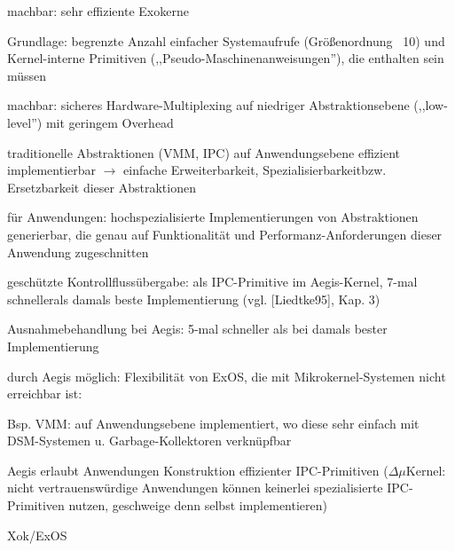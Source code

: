 \documentclass[a4paper]{article}
\begin{document}
\begin{multicols}{3}
    \begin{enumerate*}
        \item
        machbar: sehr effiziente Exokerne
        \begin{itemize*}
            \item Grundlage: begrenzte Anzahl einfacher Systemaufrufe (Größenordnung ~10) und Kernel-interne Primitiven (,,Pseudo-Maschinenanweisungen''), die enthalten sein müssen
        \end{itemize*}
        \item
        machbar: sicheres Hardware-Multiplexing auf niedriger
        Abstraktionsebene (,,low-level'') mit geringem Overhead
        \item
        traditionelle Abstraktionen (VMM, IPC) auf Anwendungsebene effizient
        implementierbar $\rightarrow$ einfache
        Erweiterbarkeit, Spezialisierbarkeitbzw. Ersetzbarkeit dieser
        Abstraktionen
        \item
        für Anwendungen: hochspezialisierte Implementierungen von
        Abstraktionen generierbar, die genau auf Funktionalität und
        Performanz-Anforderungen dieser Anwendung zugeschnitten
        \item
        geschützte Kontrollflussübergabe: als IPC-Primitive im Aegis-Kernel,
        7-mal schnellerals damals beste Implementierung (vgl. [Liedtke95],
        Kap. 3)
        \item
        Ausnahmebehandlung bei Aegis: 5-mal schneller als bei damals bester
        Implementierung
        \item
        durch Aegis möglich: Flexibilität von ExOS, die mit
        Mikrokernel-Systemen nicht erreichbar ist:
        \begin{itemize*}
            \item Bsp. VMM: auf Anwendungsebene implementiert, wo diese sehr einfach mit DSM-Systemen u. Garbage-Kollektoren verknüpfbar
        \end{itemize*}
        \item
        Aegis erlaubt Anwendungen Konstruktion effizienter IPC-Primitiven ($\Delta \mu$Kernel: nicht vertrauenswürdige Anwendungen können keinerlei spezialisierte IPC-Primitiven nutzen, geschweige denn selbst implementieren)
    \end{enumerate*}

    Xok/ExOS


\end{multicols}
\end{document}
